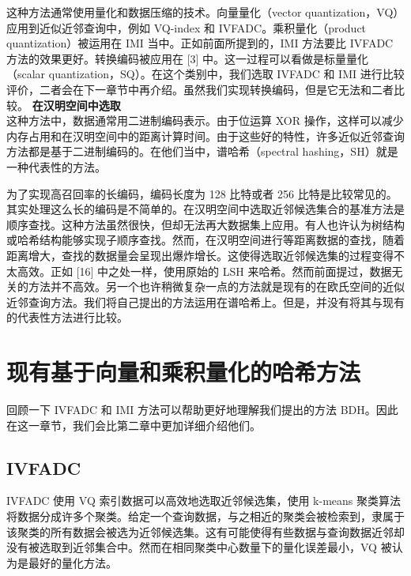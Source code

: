 这种方法通常使用量化和数据压缩的技术。向量量化（vector quantization，VQ）应用到近似近邻查询中，例如 VQ-index 和 IVFADC。乘积量化（product quantization）被运用在 IMI 当中。正如前面所提到的，IMI 方法要比 IVFADC 方法的效果更好。转换编码被应用在 [3] 中。这一过程可以看做是标量量化（scalar quantization，SQ）。在这个类别中，我们选取 IVFADC 和 IMI 进行比较评价，二者会在下一章节中再介绍。虽然我们实现转换编码，但是它无法和二者比较。
\textbf{在汉明空间中选取}\\

这种方法中，数据通常用二进制编码表示。由于位运算 XOR 操作，这样可以减少内存占用和在汉明空间中的距离计算时间。由于这些好的特性，许多近似近邻查询方法都是基于二进制编码的。在他们当中，谱哈希（spectral hashing，SH）就是一种代表性的方法。

为了实现高召回率的长编码，编码长度为 128 比特或者 256 比特是比较常见的。其实处理这么长的编码是不简单的。在汉明空间中选取近邻候选集合的基准方法是顺序查找。这种方法虽然很快，但却无法再大数据集上应用。有人也许认为树结构或哈希结构能够实现子顺序查找。然而，在汉明空间进行等距离数据的查找，随着距离增大，查找的数据量会呈现出爆炸增长。这使得选取近邻候选集的过程变得不太高效。正如 [16] 中之处一样，使用原始的 LSH 来哈希。然而前面提过，数据无关的方法并不高效。另一个也许稍微复杂一点的方法就是现有的在欧氏空间的近似近邻查询方法。我们将自己提出的方法运用在谱哈希上。但是，并没有将其与现有的代表性方法进行比较。
\section{现有基于向量和乘积量化的哈希方法}
回顾一下 IVFADC 和 IMI 方法可以帮助更好地理解我们提出的方法 BDH。因此在这一章节，我们会比第二章中更加详细介绍他们。
\subsection{IVFADC}
IVFADC 使用 VQ 索引数据可以高效地选取近邻候选集，使用 k-means 聚类算法将数据分成许多个聚类。给定一个查询数据，与之相近的聚类会被检索到，隶属于该聚类的所有数据会被选为近邻候选集。这有可能使得有些数据与查询数据近邻却没有被选取到近邻集合中。然而在相同聚类中心数量下的量化误差最小，VQ 被认为是最好的量化方法。
